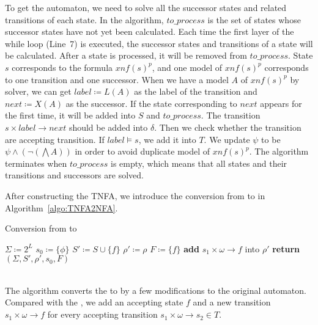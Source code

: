 To get the automaton, we need to solve all the successor states and related transitions of each state. In the algorithm, $to\_process$ is the set of states whose successor states have not yet been calculated. Each time the first layer of the while loop (Line~7) is executed, the successor states and transitions of a state will be calculated. After a state is processed, it will be removed from $to\_process$. State $s$ corresponds to the formula $xnf(s)^p$, and one model of $xnf(s)^p$ corresponds to one transition and one successor. When we have a model $A$ of $xnf(s)^p$ by \SAT solver, we can get $label\coloneqq L(A)$ as the label of the transition and $next\coloneqq X(A)$ as the successor. If the state corresponding to $next$ appears for the first time, it will be added into $S$ and $to\_process$. The transition $s\times label\to next$ should be added into $\delta$. Then we check whether the transition are accepting transition. If $label\models s$, we add it into $T$. We update $\psi$ to be $\psi\land(\neg(\bigwedge A))$ in order to avoid duplicate model of $xnf(s)^p$. The algorithm terminates when $to\_process$ is empty, which means that all states and their transitions and successors are solved.

After constructing the TNFA, we introduce the conversion from \TNFA to \NFA in Algorithm~\ref{algo:TNFA2NFA}.

\begin{algorithm}[H] \label{algo:TNFA2NFA}
  \caption{Conversion from \TNFA to \NFA}
  \LinesNumbered
  $\Sigma\coloneqq 2^L$\;
  $s_0\coloneqq\{\phi\}$\;
  $S'\coloneqq S\cup \{f\}$\;
  $\rho'\coloneqq\rho$\;
  $F\coloneqq \{f\}$\;
  {
    \textbf{add} $s_1\times \omega\to f$ into $\rho'$\;
  }
  \textbf{return} $(\Sigma,S',\rho',s_0,F)$\;
  \end{algorithm}
~\\
The algorithm converts the \TNFA to \NFA by a few modifications to the original automaton. Compared with the \TNFA, we add an accepting state $f$ and a new transition $s_1\times \omega\to f$ for every accepting transition $s_1\times \omega\to s_2\in T$.
